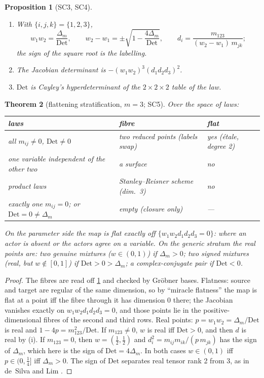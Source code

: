 \documentclass[11pt]{article}
\newtheorem{theorem}{Theorem}\newtheorem{proposition}[theorem]{Proposition}\newtheorem{corollary}[theorem]{Corollary}
\theoremstyle{definition}\newtheorem{definition}[theorem]{Definition}\newtheorem{remark}[theorem]{Remark}\newtheorem{example}[theorem]{Example}
\begin{document}
\begin{proposition}[SC3, SC4]\label{prop:inverse}
\begin{enumerate}[label=(\roman*),leftmargin=*,itemsep=1pt]
\item With $\{i,j,k\}=\{1,2,3\}$, \[w_1w_2=\frac{\Delta_m}{\mathrm{Det}},\qquad w_2-w_1=\pm\sqrt{1-\frac{4\Delta_m}{\mathrm{Det}}},\qquad d_i=\frac{m_{123}}{(w_2-w_1)\,m_{jk}};\] the sign of the square root is the labelling.
\item The Jacobian determinant is $-(w_1w_2)^3(d_1d_2d_3)^2$.
\item $\mathrm{Det}$ is Cayley's hyperdeterminant \cite{GelfandKapranovZelevinsky1994} of the $2\times2\times2$ table of the law.
\end{enumerate}
\end{proposition}

\begin{theorem}[flattening stratification, $m=3$; SC5]\label{thm:flat}
Over the space of laws:
\begin{center}\small
\begin{tabular}{lll}\toprule
laws & fibre & flat\\\midrule
all $m_{ij}\neq0$, $\mathrm{Det}\neq0$ & two reduced points (labels swap) & yes (\'etale, degree 2)\\
one variable independent of the other two & a surface & no\\
product laws & Stanley--Reisner scheme (dim.~3) & no\\
exactly one $m_{ij}=0$; or $\mathrm{Det}=0\neq\Delta_m$ & empty (closure only) & ---\\\bottomrule
\end{tabular}
\end{center}
On the parameter side the map is flat exactly off $\{w_1w_2d_1d_2d_3=0\}$: where an actor is absent or the actors agree on a variable.
On the generic stratum the real points are: two genuine mixtures ($w\in(0,1)$) if $\Delta_m>0$; two signed mixtures (real, but
$w\notin[0,1]$) if $\mathrm{Det}>0>\Delta_m$; a complex-conjugate pair if $\mathrm{Det}<0$.
\end{theorem}

\begin{proof}
The fibres are read off \cref{prop:inverse} and checked by Gr\"obner bases. Flatness: source and target are regular of the same dimension,
so by ``miracle flatness'' \cite[Thm.~23.1]{Matsumura1986} the map is flat at a point iff the fibre through it has dimension $0$ there;
the Jacobian vanishes exactly on $w_1w_2d_1d_2d_3=0$, and those points lie in the positive-dimensional fibres of the second and third rows.
Real points: $p=w_1w_2=\Delta_m/\mathrm{Det}$ is real and $1-4p=m_{123}^2/\mathrm{Det}$. If $m_{123}\neq0$, $w$ is real iff
$\mathrm{Det}>0$, and then $d$ is real by (i). If $m_{123}=0$, then $w=(\frac12,\frac12)$ and $d_i^2=m_{ij}m_{ik}/(p\,m_{jk})$ has the sign of
$\Delta_m$, which here is the sign of $\mathrm{Det}=4\Delta_m$. In both cases $w\in(0,1)$ iff $p\in(0,\frac14]$ iff $\Delta_m>0$. The sign of $\mathrm{Det}$ separates real tensor rank 2
from 3, as in de~Silva and Lim \cite{deSilvaLim2008}.
\end{proof}
\end{document}
